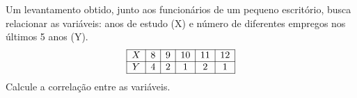 %
%


\begin{exercicioBanco}[\valorquestao]
    Um levantamento obtido, junto aos funcionários de um pequeno escritório, busca relacionar as variáveis: anos de estudo (X) e número de diferentes empregos nos últimos 5 anos (Y).
    \[
        \begin{array}{|c|c|c|c|c|c|}
            \hline
            X & 8 & 9 & 10 & 11 & 12 \\
            \hline
            Y & 4 & 2 & 1 & 2 & 1 \\
            \hline
        \end{array}
    \]
    Calcule a correlação entre as variáveis.
\end{exercicioBanco}

